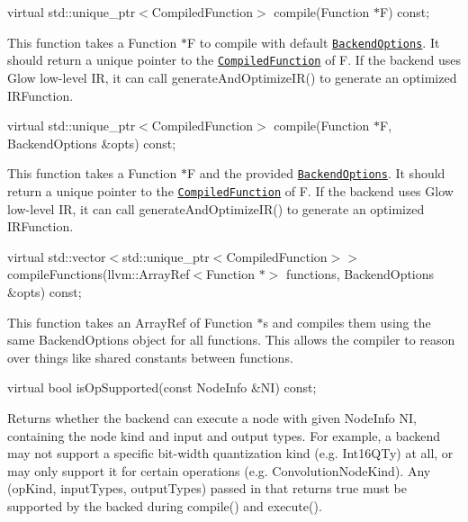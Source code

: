 \begin{DoxyItemize}
\item {\ttfamily virtual std\+::unique\+\_\+ptr$<$Compiled\+Function$>$ compile(\+Function $\ast$\+F) const;}
\begin{DoxyItemize}
\item This function takes a {\ttfamily Function $\ast$F} to compile with default \href{#backendoptions-helper-struct}{\tt {\ttfamily Backend\+Options}}. It should return a unique pointer to the \href{#compiledfunction-abstract-class}{\tt {\ttfamily Compiled\+Function}} of {\ttfamily F}. If the backend uses Glow low-\/level IR, it can call {\ttfamily generate\+And\+Optimize\+I\+R()} to generate an optimized {\ttfamily I\+R\+Function}.
\end{DoxyItemize}
\item {\ttfamily virtual std\+::unique\+\_\+ptr$<$Compiled\+Function$>$ compile(\+Function $\ast$\+F, Backend\+Options \&opts) const;}
\begin{DoxyItemize}
\item This function takes a {\ttfamily Function $\ast$F} and the provided \href{#backendoptions-helper-struct}{\tt {\ttfamily Backend\+Options}}. It should return a unique pointer to the \href{#compiledfunction-abstract-class}{\tt {\ttfamily Compiled\+Function}} of {\ttfamily F}. If the backend uses Glow low-\/level IR, it can call {\ttfamily generate\+And\+Optimize\+I\+R()} to generate an optimized {\ttfamily I\+R\+Function}.
\end{DoxyItemize}
\item {\ttfamily virtual std\+::vector$<$std\+::unique\+\_\+ptr$<$Compiled\+Function$>$$>$ compile\+Functions(llvm\+::\+Array\+Ref$<$Function $\ast$$>$ functions, Backend\+Options \&opts) const;}
\begin{DoxyItemize}
\item This function takes an {\ttfamily Array\+Ref} of {\ttfamily Function $\ast$}s and compiles them using the same {\ttfamily Backend\+Options} object for all functions. This allows the compiler to reason over things like shared constants between functions.
\end{DoxyItemize}
\item {\ttfamily virtual bool is\+Op\+Supported(const Node\+Info \&\+N\+I) const;}
\begin{DoxyItemize}
\item Returns whether the backend can execute a node with given Node\+Info {\ttfamily NI}, containing the node kind and input and output types. For example, a backend may not support a specific bit-\/width quantization kind (e.\+g. {\ttfamily Int16\+Q\+Ty}) at all, or may only support it for certain operations (e.\+g. {\ttfamily Convolution\+Node\+Kind}). Any {\ttfamily (op\+Kind, input\+Types, output\+Types)} passed in that returns true must be supported by the backed during {\ttfamily compile()} and {\ttfamily execute()}.
\end{DoxyItemize}
\end{DoxyItemize}


